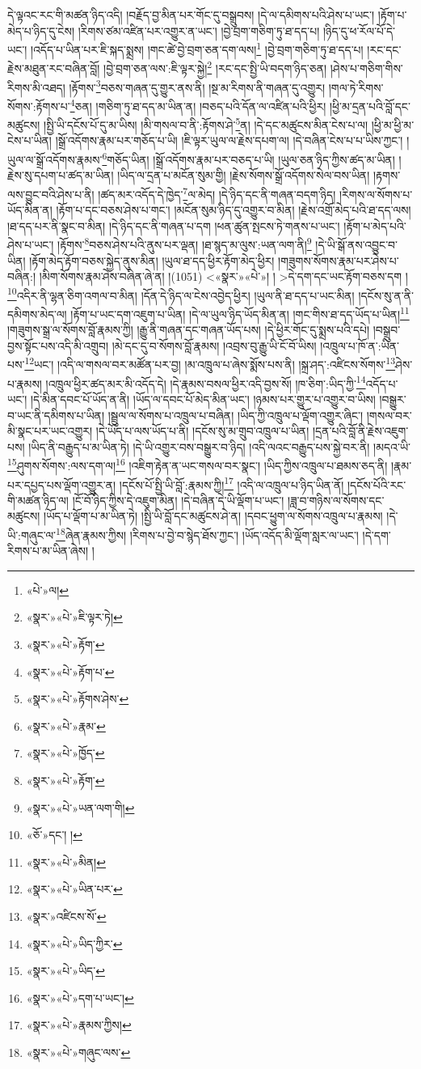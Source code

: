 དེ་ལྟའང་རང་གི་མཚན་ཉིད་འདི། །བརྗོད་བྱ་མིན་པར་གོང་དུ་བསྒྲུབས། །དེ་ལ་དམིགས་པའི་ཤེས་པ་ཡང་། །རྟོག་པ་མེད་པ་ཉིད་དུ་ངེས། །རིགས་ཙམ་འཛིན་པར་འགྱུར་ན་ཡང་། །བྱེ་བྲག་གཅིག་ཏུ་ཐ་དད་པ། །ཉིད་དུ་ཕ་རོལ་པོ་དེ་ཡང་། །འདོད་པ་ཡིན་པར་ཇི་སྐད་སྨྲས། །གང་ཚེ་བྱེ་བྲག་ཅན་དག་ལས།\footnote{«པེ་»ལ།} །བྱེ་བྲག་གཅིག་ཏུ་ཐ་དད་པ། །རང་དང་རྗེས་མཐུན་རང་བཞིན་བློ། །བྱེ་བྲག་ཅན་ལས་:ཇི་ལྟར་སྐྱེ།\footnote{«སྣར་»«པེ་»ཇི་ལྟར་ཏེ།} །རང་དང་སྤྱི་ཡི་བདག་ཉིད་ཅན། །ཤེས་པ་གཅིག་གིས་རིགས་མི་འཐད། །རྟོགས་\footnote{«སྣར་»«པེ་»རྟོག་}བཅས་གཞན་དུ་གྱུར་ནས་ནི། །སྔ་མ་རིགས་ནི་གཞན་དུ་འགྱུར། །གལ་ཏེ་རིགས་སོགས་:རྟོགས་པ་\footnote{«སྣར་»«པེ་»རྟོག་པ་}ཅན། །གཅིག་ཏུ་ཐ་དད་མ་ཡིན་ན། །བཅད་པའི་དོན་ལ་འཛིན་པའི་ཕྱིར། །ཕྱི་མ་དྲན་པའི་བློ་དང་མཚུངས། །སྤྱི་ཡི་དངོས་པོ་དུ་མ་ཡིས། །མི་གསལ་བ་ནི་:རྟོགས་ཤེ་\footnote{«སྣར་»«པེ་»རྟོགས་ཤེས་}ན། །དེ་དང་མཚུངས་མིན་ངེས་པ་ལ། །ཕྱི་མ་ཕྱི་མ་ངེས་པ་ཡིན། །སྒྲོ་འདོགས་རྣམ་པར་གཅོད་པ་ཡི། །ཇི་ལྟར་ཡུལ་ལ་རྗེས་དཔག་ལ། །དེ་བཞིན་ངེས་པ་པ་ཡིས་ཀྱང་། །ཡུལ་ལ་སྒྲོ་འདོགས་རྣམས་\footnote{«སྣར་»«པེ་»རྣམ་}གཅོད་ཡིན། །སྒྲོ་འདོགས་རྣམ་པར་བཅད་པ་ཡི། །ཡུལ་ཅན་ཉིད་ཀྱིས་ཚད་མ་ཡིན། །རྗེས་སུ་དཔག་པ་ཚད་མ་ཡིན། །ཡིད་ལ་དྲན་པ་མངོན་སུམ་གྱི། །རྗེས་སོགས་སྒྲོ་འདོགས་སེལ་བས་ཡིན། །རྟགས་ལས་བྱུང་བའི་ཤེས་པ་ནི། །ཚད་མར་འདོད་དེ་ཁྱེད་\footnote{«སྣར་»«པེ་»ཁྱོད་}ལ་མེད། །དེ་ཉིད་དང་ནི་གཞན་བདག་ཉིད། །རིགས་ལ་སོགས་པ་ཡོད་མིན་ན། །རྟོག་པ་དང་བཅས་ཤེས་པ་གང་། །མངོན་སུམ་ཉིད་དུ་འགྱུར་བ་མིན། །རྗེས་འགྲོ་མེད་པའི་ཐ་དད་ལས། །ཐ་དད་པར་ནི་སྣང་བ་མིན། །དེ་ཉིད་དང་ནི་གཞན་པ་དག །ཕན་ཚུན་སྤངས་ཏེ་གནས་པ་ཡང་། །རྟོག་པ་མེད་པའི་ཤེས་པ་ཡང་། །རྟོགས་\footnote{«སྣར་»«པེ་»རྟོག་}བཅས་ཤེས་པའི་ནུས་པར་ལྡན། །ཐ་སྙད་མ་ལུས་:ཡན་ལག་ནི།\footnote{«སྣར་»«པེ་»ཡན་ལག་གི།} །དེ་ཡི་སྒོ་ནས་འབྱུང་བ་ཡིན། །རྟོག་མེད་རྟོག་བཅས་སྐྱེད་ནུས་མིན། །ཡུལ་ཐ་དད་ཕྱིར་རྟོག་མེད་ཕྱིར། །གཟུགས་སོགས་རྣམ་པར་ཤེས་པ་བཞིན:། །མིག་སོགས་རྣམ་ཤེས་བཞིན་ཞེ་ན། །(1051) <«སྣར་»«པེ་»། །
>དེ་དག་དང་ཡང་རྟོག་བཅས་དག །\footnote{«ཅོ་»དང་། །}འདིར་ནི་ལྷན་ཅིག་འགལ་བ་མིན། །དོན་དེ་ཉིད་ལ་ངེས་འབྱེད་ཕྱིར། །ཡུལ་ནི་ཐ་དད་པ་ཡང་མིན། །དངོས་སུ་ན་ནི་དམིགས་མེད་ལ། །རྟོག་པ་ཡང་དག་འཇུག་པ་ཡིན། །དེ་ལ་ཡུལ་ཉིད་ཡོད་མིན་ན། །གང་གིས་ཐ་དད་ཡོད་པ་ཡིན།\footnote{«སྣར་»«པེ་»མིན།} །གཟུགས་སྒྲ་ལ་སོགས་བློ་རྣམས་ཀྱི། །རྒྱུ་ནི་གཞན་དང་གཞན་ཡོད་པས། །དེ་ཕྱིར་གོང་དུ་སྨྲས་པའི་དཔེ། །བསྒྲུབ་བྱས་སྟོང་པས་འདི་མི་འགྲུབ། །མེ་དང་དུ་བ་སོགས་བློ་རྣམས། །འབྲས་བུ་རྒྱུ་ཡི་ངོ་བོ་ཡིས། །འཁྲུལ་པ་ཁོ་ན་:ཡིན་པས་\footnote{«སྣར་»«པེ་»ཡིན་པར་}ཡང་། །འདི་ལ་གསལ་བར་མཚོན་པར་བྱ། །མ་འཁྲུལ་པ་ཞེས་སྨོས་པས་ནི། །སྐྲ་ཤད་:འཛིངས་སོགས་\footnote{«སྣར་»འཛིངས་སོ་}ཤེས་པ་རྣམས། །འཁྲུལ་ཕྱིར་ཚད་མར་མི་འདོད་དེ། །དེ་རྣམས་བསལ་ཕྱིར་འདི་བྱས་སོ། །ཁ་ཅིག་:ཡིད་ཀྱི་\footnote{«སྣར་»«པེ་»ཡིད་ཀྱིར་}འདོད་པ་ཡང་། །དེ་མིན་དབང་པོ་ཡོད་ན་ནི། །ཡོད་ལ་དབང་པོ་མེད་མིན་ཡང་། །ཉམས་པར་གྱུར་པ་འགྱུར་བ་ཡིས། །བསྒྱུར་བ་ཡང་ནི་དམིགས་པ་ཡིན། །སྦྲུལ་ལ་སོགས་པ་འཁྲུལ་པ་བཞིན། །ཡིད་ཀྱི་འཁྲུལ་པ་ལྡོག་འགྱུར་ཞིང་། །གསལ་བར་མི་སྣང་པར་ཡང་འགྱུར། །དེ་ཡོད་པ་ལས་ཡོད་པ་ནི། །དངོས་སུ་མ་གྲུབ་འཁྲུལ་པ་ཡིན། །དྲན་པའི་བློ་ནི་རྗེས་འཇུག་པས། །ཡིད་ནི་བརྒྱུད་པ་མ་ཡིན་ཏེ། །དེ་ཡི་འགྱུར་བས་བསྒྱུར་བ་ཉིད། །འདི་ལའང་བརྒྱུད་པས་སྐྱེ་བར་ནི། །མདའ་ཡི་\footnote{«སྣར་»«པེ་»ཡིད་}ཤུགས་སོགས་:ལས་དག་ལ།\footnote{«སྣར་»«པེ་»དག་པ་ཡང་།} །འཇིག་རྟེན་ན་ཡང་གསལ་བར་སྣང་། །ཡིད་ཀྱིས་འཁྲུལ་པ་ཐམས་ཅད་ནི། །རྣམ་པར་དཔྱད་པས་ལྡོག་འགྱུར་ན། །དངོས་པོ་སྤྱི་ཡི་བློ་:རྣམས་ཀྱི།\footnote{«སྣར་»«པེ་»རྣམས་ཀྱིས།} །འདི་ལ་འཁྲུལ་པ་ཉིད་ཡིན་ནོ། །དངོས་པོའི་རང་གི་མཚན་ཉིད་ལ། །ངོ་བོ་ཉིད་ཀྱིས་དེ་འཇུག་མིན། །དེ་བཞིན་དེ་ཡི་ལྡོག་པ་ཡང་། །ཟླ་བ་གཉིས་ལ་སོགས་དང་མཚུངས། །ཡོད་པ་ལྡོག་པ་མ་ཡིན་ཏེ། །སྤྱི་ཡི་བློ་དང་མཚུངས་ཤེ་ན། །དབང་ཕྱུག་ལ་སོགས་འཁྲུལ་པ་རྣམས། །དེ་ཡི་:གཞུང་ལ་\footnote{«སྣར་»«པེ་»གཞུང་ལས་}ཞེན་རྣམས་ཀྱིས། །རིགས་པ་བྱེ་བ་སྙེད་ཐོས་ཀྱང་། །ཡོད་འདོད་མི་ལྡོག་སླར་ལ་ཡང་། །དེ་དག་རིགས་པ་མ་ཡིན་ཞེས། །
